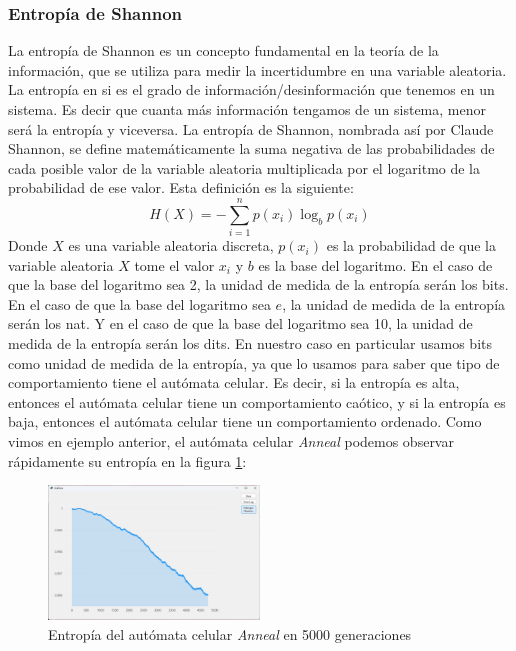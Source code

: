 \subsubsection{Entrop\'ia de Shannon}
\label{sec:Entriopia}
    La entrop\'ia de Shannon es un concepto fundamental en la teor\'ia de la informaci\'on, 
        que se utiliza para medir la incertidumbre en una variable aleatoria. La entrop\'ia en si 
        es el grado de informaci\'on/desinformaci\'on que tenemos en un sistema. Es decir que cuanta m\'as
        informaci\'on tengamos de un sistema, menor ser\'a la entrop\'ia y viceversa. La entrop\'ia de Shannon, 
        nombrada as\'i por Claude Shannon\cite{Shannon1948}, se define matem\'aticamente la suma negativa de las probabilidades de cada
        posible valor de la variable aleatoria multiplicada por el logaritmo de la probabilidad de ese valor. Esta
        definici\'on es la siguiente:
        \begin{equation}
            H(X) = -\sum_{i=1}^{n} p(x_i) \log_b p(x_i)
        \end{equation}
    \vskip 0.5cm
    Donde $X$ es una variable aleatoria discreta, $p(x_i)$ es la probabilidad de que la variable aleatoria 
        $X$ tome el valor $x_i$ y $b$ es la base del logaritmo. En el caso de que la base del logaritmo sea 2, 
        la unidad de medida de la entrop\'ia ser\'an los bits. En el caso de que la base del logaritmo sea $e$,
        la unidad de medida de la entrop\'ia ser\'an los nat. Y en el caso de que la base del logaritmo sea 10, 
        la unidad de medida de la entrop\'ia ser\'an los dits.
    \vskip 0.5cm
    En nuestro caso en particular usamos bits como unidad de medida de la entrop\'ia, ya que lo usamos para saber que tipo de comportamiento
        tiene el aut\'omata celular. Es decir, si la entrop\'ia es alta, entonces el aut\'omata celular tiene un comportamiento ca\'otico, y si 
        la entrop\'ia es baja, entonces el aut\'omata celular tiene un comportamiento ordenado.
    \vskip 0.5cm
    Como vimos en ejemplo anterior, el aut\'omata celular \textit{Anneal} podemos observar r\'apidamente su entrop\'ia
        en la figura \ref{fig:annealEntropia}: 
        \begin{figure}[h]
            \centering
            \includegraphics[width=0.5\textwidth]{./images/marco_teorico/automatas_celulares/Anneal5kShann.png}
            \caption{Entrop\'ia del aut\'omata celular \textit{Anneal} en 5000 generaciones}
            \label{fig:annealEntropia}  
        \end{figure}